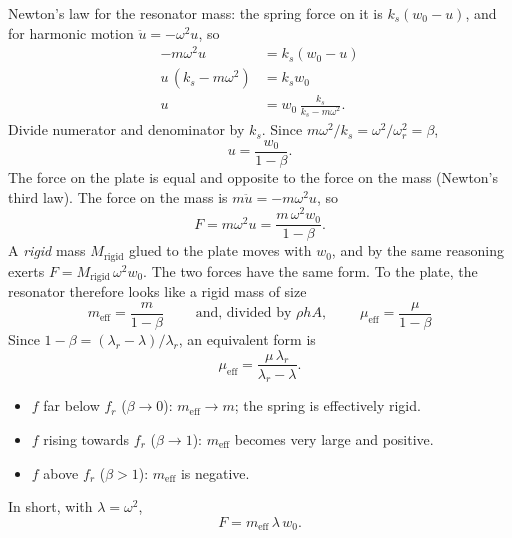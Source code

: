Newton's law for the resonator mass: the spring force on it is
$k_s(w_0 - u)$, and for harmonic motion $\ddot{u} = -\omega^2 u$, so
\begin{align}
  -m\omega^2 u &= k_s(w_0 - u) \\
  u\,(k_s - m\omega^2) &= k_s w_0 \\
  u &= w_0\,\frac{k_s}{k_s - m\omega^2} .
\end{align}
Divide numerator and denominator by $k_s$. Since
$m\omega^2/k_s = \omega^2/\omega_r^2 = \beta$,
\begin{equation}
  u = \frac{w_0}{1 - \beta} .
  \label{eq:u_over_w}
\end{equation}
The force on the plate is equal and opposite to the force on the mass (Newton's
third law). The force on the mass is $m\ddot{u} = -m\omega^2 u$, so
\begin{equation}
  F = m\omega^2 u = \frac{m\,\omega^2 w_0}{1 - \beta} .
\end{equation}
A \emph{rigid} mass $M_\mathrm{rigid}$ glued to the plate moves with $w_0$, and
by the same reasoning exerts $F = M_\mathrm{rigid}\,\omega^2 w_0$. The two forces
have the same form. To the plate, the resonator therefore looks like a rigid
mass of size
\begin{equation}
  \boxed{\;m_\mathrm{eff} = \frac{m}{1-\beta}\;}
  \qquad\text{and, divided by } \rho h A, \qquad
  \boxed{\;\mu_\mathrm{eff} = \frac{\mu}{1-\beta}\;}
\end{equation}
Since $1 - \beta = (\lambda_r - \lambda)/\lambda_r$, an equivalent form is
\begin{equation}
  \mu_\mathrm{eff} = \frac{\mu\,\lambda_r}{\lambda_r - \lambda} .
  \label{eq:mu_eff_lambda}
\end{equation}
\begin{itemize}
  \item $f$ far below $f_r$ ($\beta \to 0$): $m_\mathrm{eff} \to m$; the spring
        is effectively rigid.
  \item $f$ rising towards $f_r$ ($\beta \to 1$): $m_\mathrm{eff}$ becomes very
        large and positive.
  \item $f$ above $f_r$ ($\beta > 1$): $m_\mathrm{eff}$ is negative.
\end{itemize}
In short, with $\lambda = \omega^2$,
\begin{equation}
  F = m_\mathrm{eff}\,\lambda\, w_0 .
  \label{eq:force}
\end{equation}

